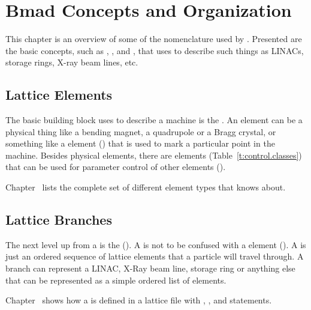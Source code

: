 \chapter{Bmad Concepts and Organization}
\label{c:lat.concepts}

This chapter is an overview of some of the nomenclature used
by \bmad. Presented are the basic concepts, such as ,
, and , that \bmad uses to describe such things
as LINACs, storage rings, X-ray beam lines, etc.  

\section{Lattice Elements}
\label{s:element.def}

The basic building block \bmad uses to describe a machine is the
 . An element can be
a physical thing like a bending magnet, a quadrupole or a Bragg
crystal, or something like a  element ()
that is used to mark a particular point in the machine.
Besides physical elements, there are  elements
(Table~\ref{t:control.classes}) that can be used for parameter control
of other elements ().

Chapter~ lists the complete set of different element
types that \bmad knows about.

\section{Lattice Branches}
\label{s:branch.def}

The next level up from a   is the 
 (). A   is not to
be confused with a  element (). A
  is just an ordered sequence of lattice
elements that a particle will travel through. A branch can represent a
LINAC, X-Ray beam line, storage ring or anything else that can be
represented as a simple ordered list of elements.

Chapter~ shows how a  is defined in a
lattice file with , , and  statements.

